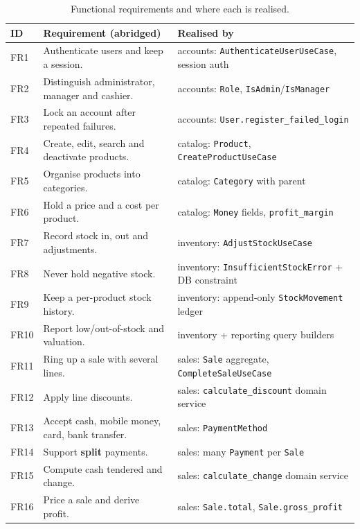 \documentclass[11pt,a4paper]{article}
\begin{document}
\begin{table}[htbp]\centering
\small
\caption{Functional requirements and where each is realised.}
\label{tab:requirements}
\begin{tabular}{@{}p{}p{}p{}@{}}
\toprule
\textbf{ID} & \textbf{Requirement (abridged)} & \textbf{Realised by} \\
\midrule
FR1 & Authenticate users and keep a session. & accounts: \texttt{AuthenticateUserUseCase}, session auth \\
FR2 & Distinguish administrator, manager and cashier. & accounts: \texttt{Role}, \texttt{IsAdmin}/\texttt{IsManager} \\
FR3 & Lock an account after repeated failures. & accounts: \texttt{User.register\_failed\_login} \\
FR4 & Create, edit, search and deactivate products. & catalog: \texttt{Product}, \texttt{CreateProductUseCase} \\
FR5 & Organise products into categories. & catalog: \texttt{Category} with parent \\
FR6 & Hold a price and a cost per product. & catalog: \texttt{Money} fields, \texttt{profit\_margin} \\
FR7 & Record stock in, out and adjustments. & inventory: \texttt{AdjustStockUseCase} \\
FR8 & Never hold negative stock. & inventory: \texttt{InsufficientStockError} + DB constraint \\
FR9 & Keep a per-product stock history. & inventory: append-only \texttt{StockMovement} ledger \\
FR10 & Report low/out-of-stock and valuation. & inventory + reporting query builders \\
FR11 & Ring up a sale with several lines. & sales: \texttt{Sale} aggregate, \texttt{CompleteSaleUseCase} \\
FR12 & Apply line discounts. & sales: \texttt{calculate\_discount} domain service \\
FR13 & Accept cash, mobile money, card, bank transfer. & sales: \texttt{PaymentMethod} \\
FR14 & Support \textbf{split} payments. & sales: many \texttt{Payment} per \texttt{Sale} \\
FR15 & Compute cash tendered and change. & sales: \texttt{calculate\_change} domain service \\
FR16 & Price a sale and derive profit. & sales: \texttt{Sale.total}, \texttt{Sale.gross\_profit} \\

\end{tabular}
\end{table}
\end{document}
